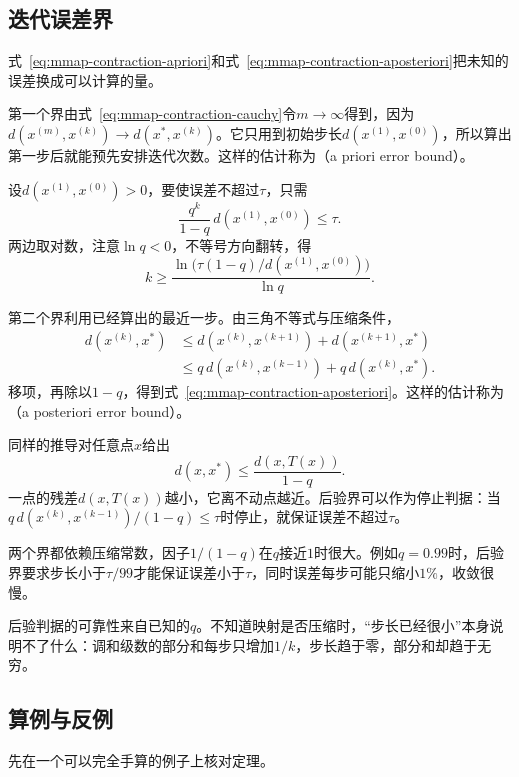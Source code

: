 \subsection{迭代误差界}
\label{sec:mmap-error-bounds}

式~\eqref{eq:mmap-contraction-apriori}和式~\eqref{eq:mmap-contraction-aposteriori}把未知的误差换成可以计算的量。

第一个界由式~\eqref{eq:mmap-contraction-cauchy}令$m\to\infty$得到，因为$d(x^{(m)},x^{(k)})\to d(x^\ast,x^{(k)})$。它只用到初始步长$d(x^{(1)},x^{(0)})$，所以算出第一步后就能预先安排迭代次数。这样的估计称为（a priori error bound）。

设$d(x^{(1)},x^{(0)})>0$，要使误差不超过$\tau$，只需
\[
 \frac{q^k}{1-q}\,d(x^{(1)},x^{(0)})\leq\tau.
\]
两边取对数，注意$\ln q<0$，不等号方向翻转，得
\[
 k\geq\frac{\ln\bigl(\tau(1-q)/d(x^{(1)},x^{(0)})\bigr)}{\ln q}.
\]

第二个界利用已经算出的最近一步。由三角不等式与压缩条件，
\[
 \begin{aligned}
 d(x^{(k)},x^\ast)
 &\leq d(x^{(k)},x^{(k+1)})+d(x^{(k+1)},x^\ast)\\
 &\leq q\,d(x^{(k)},x^{(k-1)})+q\,d(x^{(k)},x^\ast).
 \end{aligned}
\]
移项，再除以$1-q$，得到式~\eqref{eq:mmap-contraction-aposteriori}。这样的估计称为（a posteriori error bound）。

同样的推导对任意点$x$给出
\[
 d(x,x^\ast)\leq\frac{d(x,T(x))}{1-q}.
\]
一点的残差$d(x,T(x))$越小，它离不动点越近。后验界可以作为停止判据：当$q\,d(x^{(k)},x^{(k-1)})/(1-q)\leq\tau$时停止，就保证误差不超过$\tau$。

两个界都依赖压缩常数，因子$1/(1-q)$在$q$接近$1$时很大。例如$q=0.99$时，后验界要求步长小于$\tau/99$才能保证误差小于$\tau$，同时误差每步可能只缩小$1\%$，收敛很慢。

后验判据的可靠性来自已知的$q$。不知道映射是否压缩时，“步长已经很小”本身说明不了什么：调和级数的部分和每步只增加$1/k$，步长趋于零，部分和却趋于无穷。

\subsection{算例与反例}
\label{sec:mmap-contraction-examples}

先在一个可以完全手算的例子上核对定理。

